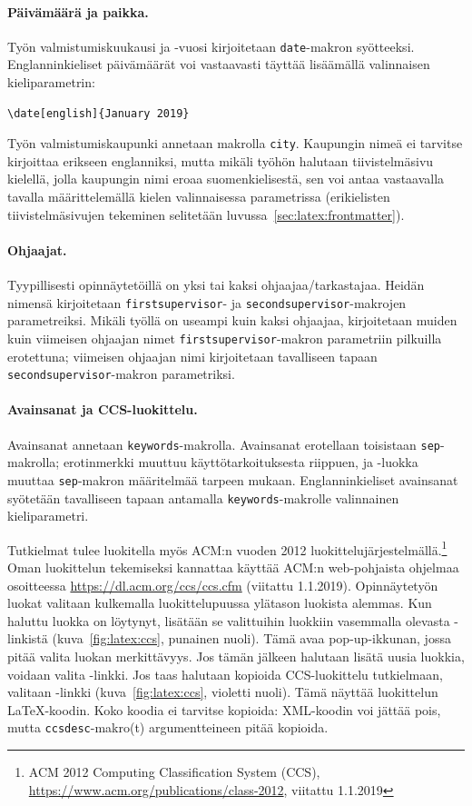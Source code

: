 \paragraph{Päivämäärä ja paikka.}
Työn valmistumiskuukausi ja -vuosi kirjoitetaan \texttt{date}-makron syötteeksi. Englanninkieliset päivämäärät voi vastaavasti täyttää lisäämällä valinnaisen kieliparametrin:
\begin{verbatim}
\date[english]{January 2019}
\end{verbatim}
Työn valmistumiskaupunki annetaan makrolla \texttt{city}. Kaupungin nimeä ei tarvitse kirjoittaa erikseen englanniksi, mutta mikäli työhön halutaan tiivistelmäsivu kielellä, jolla kaupungin nimi eroaa suomenkielisestä, sen voi antaa vastaavalla tavalla määrittelemällä kielen valinnaisessa parametrissa (erikielisten tiivistelmäsivujen tekeminen selitetään luvussa~\ref{sec:latex:frontmatter}).

\paragraph{Ohjaajat.}
Tyypillisesti opinnäytetöillä on yksi tai kaksi ohjaajaa/tarkastajaa. Heidän nimensä kirjoitetaan \texttt{firstsupervisor}- ja \texttt{secondsupervisor}-makrojen parametreiksi. Mikäli työllä on useampi kuin kaksi ohjaajaa, kirjoitetaan muiden kuin viimeisen ohjaajan nimet \texttt{firstsupervisor}-makron parametriin pilkuilla erotettuna; viimeisen ohjaajan nimi kirjoitetaan tavalliseen tapaan \texttt{secondsupervisor}-makron parametriksi.

\paragraph{Avainsanat ja CCS-luokittelu.}
Avainsanat annetaan \texttt{keywords}-makrolla. Avainsanat erotellaan toisistaan \texttt{sep}-makrolla; erotinmerkki muuttuu käyttötarkoituksesta riippuen, ja \uefcsthesis-luokka muuttaa \texttt{sep}-makron määritelmää tarpeen mukaan. Englanninkieliset avainsanat syötetään tavalliseen tapaan antamalla \texttt{keywords}-makrolle valinnainen kieliparametri.

Tutkielmat tulee luokitella myös ACM:n vuoden 2012 luokittelujärjestelmällä.\footnote{ACM 2012 Computing Classification System (CCS), \url{https://www.acm.org/publications/class-2012}, viitattu 1.1.2019} Oman luokittelun tekemiseksi kannattaa käyttää ACM:n web-pohjaista ohjelmaa osoitteessa \url{https://dl.acm.org/ccs/ccs.cfm} (viitattu 1.1.2019). Opinnäytetyön luokat valitaan kulkemalla luokittelupuussa ylätason luokista alemmas. Kun haluttu luokka on löytynyt, lisätään se valittuihin luokkiin vasemmalla olevasta -linkistä (kuva~\ref{fig:latex:ccs}, punainen nuoli). Tämä avaa pop-up-ikkunan, jossa pitää valita luokan merkittävyys. Jos tämän jälkeen halutaan lisätä uusia luokkia, voidaan valita -linkki. Jos taas halutaan kopioida CCS-luokittelu tutkielmaan, valitaan -linkki (kuva~\ref{fig:latex:ccs}, violetti nuoli). Tämä näyttää luokittelun \LaTeX-koodin. Koko koodia ei tarvitse kopioida: XML-koodin voi jättää pois, mutta \texttt{ccsdesc}-makro(t) argumentteineen pitää kopioida.

